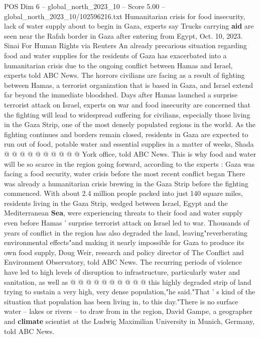 \begin{textsample}{POS Dim 6 – global\_north\_2023\_10 – Score 5.00 – global\_north\_2023\_10/102596216.txt}  \label{ex:f6_pos_246}
Humanitarian crisis for food insecurity, lack of water supply about to begin in Gaza, experts say Trucks carrying \textbf{aid} are seen near the Rafah border in Gaza after entering from Egypt, Oct. 10, 2023.
Sinai For Human Rights via Reuters An already precarious situation regarding food and water supplies for the residents of Gaza has exacerbated into a humanitarian crisis due to the ongoing conflict between Hamas and Israel, experts told ABC News.
The horrors civilians are facing as a result of fighting between Hamas, a terrorist organization that is based in Gaza, and Israel extend far beyond the immediate bloodshed.
Days after Hamas launched a surprise terrorist attack on Israel, experts on war and food insecurity are concerned that the fighting will lead to widespread suffering for civilians, especially those living in the Gaza Strip, one of the most densely populated regions in the world.
As the fighting continues and borders remain closed, residents in Gaza are expected to run out of food, potable water and essential supplies in a matter of weeks, Shada @ @ @ @ @ @ @ @ @ @ York office, told ABC News.
This is why food and water will be so scarce in the region going forward, according to the experts : Gaza was facing a food security, water crisis before the most recent conflict began There was already a humanitarian crisis brewing in the Gaza Strip before the fighting commenced.
With about 2.4 million people packed into just 140 square miles, residents living in the Gaza Strip, wedged between Israel, Egypt and the Mediterranean \textbf{Sea}, were experiencing threats to their food and water supply even before Hamas ' surprise terrorist attack on Israel led to war.
Thousands of years of conflict in the region has also degraded the land, leaving"reverberating environmental effects"and making it nearly impossible for Gaza to produce its own food supply, Doug Weir, research and policy director of The Conflict and Environment Observatory, told ABC News.
The recurring periods of violence have led to high levels of disruption to infrastructure, particularly water and sanitation, as well as @ @ @ @ @ @ @ @ @ @ this highly degraded strip of land trying to sustain a very high, very dense population,"he said."That ' s kind of the situation that population has been living in, to this day."There is no surface water -- lakes or rivers -- to draw from in the region, David Gampe, a geographer and \textbf{climate} scientist at the Ludwig Maximilian University in Munich, Germany, told ABC News.

\end{textsample}
